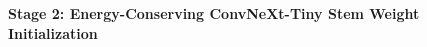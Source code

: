 \documentclass[preview]{standalone}
\begin{document}
\begin{center}
\textbf{Stage 2: Energy-Conserving ConvNeXt-Tiny Stem Weight Initialization}
\end{center}
\end{document}
